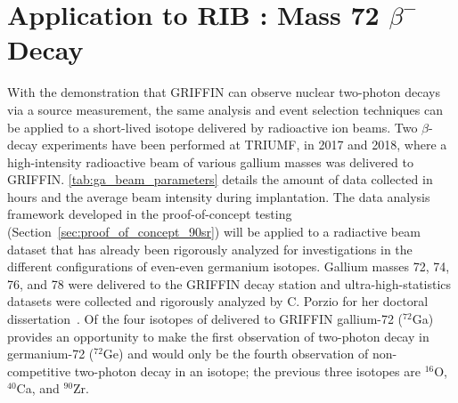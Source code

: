 \documentclass[cnatzke_thesis_proposal.tex]{subfiles}
\begin{document}
\chapter{Application to RIB : Mass 72 $\beta^-$ Decay}

With the demonstration that GRIFFIN can observe nuclear two-photon decays via a source measurement, the same analysis and event selection techniques can be applied to a short-lived isotope delivered by radioactive ion beams. 
Two $\beta$-decay experiments have been performed at TRIUMF, in 2017 and 2018, where a high-intensity radioactive beam of various gallium masses was delivered to GRIFFIN. 
\ref{tab:ga_beam_parameters} details the amount of data collected in hours and the average beam intensity during implantation.
The data analysis framework developed in the proof-of-concept testing (Section~\ref{sec:proof_of_concept_90sr}) will be applied to a radiactive beam dataset that has already been rigorously analyzed for investigations in the different configurations of even-even germanium isotopes.
Gallium masses 72, 74, 76, and 78 were delivered to the GRIFFIN decay station and ultra-high-statistics datasets were collected and rigorously analyzed by C. Porzio for her doctoral dissertation~\cite{porzio_configuration_2021}.
Of the four isotopes of delivered to GRIFFIN gallium-72 ($^{72}$Ga) provides an opportunity to make the first observation of two-photon decay in germanium-72 ($^{72}$Ge) and would only be the fourth observation of non-competitive two-photon decay in an isotope; the previous three isotopes are $^{16}$O, $^{40}$Ca, and $^{90}$Zr.
\end{document}

